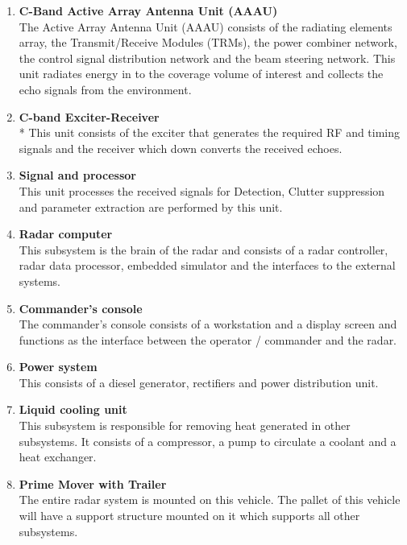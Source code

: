 \documentclass[12pt]{article} %
\begin{document}
 \begin{enumerate}
\item \textbf {C-Band Active Array Antenna Unit (AAAU)}
\\The Active Array Antenna Unit (AAAU) consists of the radiating elements array, the Transmit/Receive Modules (TRMs), the power combiner network, the control signal distribution network and the beam steering network. This unit radiates energy in to the coverage volume of interest and collects the echo signals from the environment.
\item \textbf {C-band Exciter-Receiver}  
\\*	This unit consists of the exciter that generates the required RF and timing signals and the receiver which down converts the received echoes.

\item \textbf {Signal and processor}
\\ This unit processes the received signals for Detection, Clutter suppression and parameter extraction are performed by this unit.

\item \textbf {Radar computer}
\\	This subsystem is the brain of the radar and consists of a radar controller, radar data processor, embedded simulator and the interfaces to the external systems. 

\item \textbf {Commander’s console}
\\	The commander’s console consists of a workstation and a display screen and functions as the interface between the operator / commander and the radar.

\item \textbf {Power system}
\\	This consists of a diesel generator, rectifiers and power distribution unit.

\item \textbf {Liquid cooling unit}
\\	This subsystem is responsible for removing heat generated in other subsystems. It consists of a compressor, a pump to circulate a coolant and a heat exchanger.

\item \textbf {Prime Mover with Trailer}
\\	The entire radar system is mounted on this vehicle. The pallet of this vehicle will have a support structure mounted on it which supports all other subsystems.


\end{enumerate}
\end{document}
